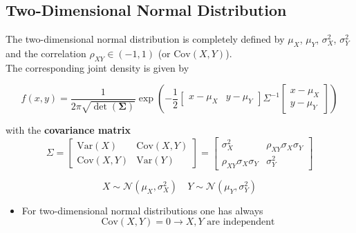 \subsection{Two-Dimensional Normal Distribution}
The two-dimensional normal distribution is completely defined by $\mu_X$, $\mu_Y$, $\sigma_X^2$, $\sigma_Y^2$ and the correlation $\rho_{XY}\in(-1,1)$ (or $\mathrm{Cov}(X,Y)$).\\
The corresponding joint density is given by
\begin{footnotesize}
    \noindent\begin{equation*}
        f(x,y) = \frac{1}{2\pi\sqrt{\det(\bm{\Sigma})}}\exp\left(-\frac{1}{2}\begin{bmatrix}x-\mu_X & y-\mu_Y\end{bmatrix}\Sigma^{-1}\begin{bmatrix}x-\mu_X \\ y-\mu_Y \end{bmatrix}\right)
    \end{equation*}
\end{footnotesize}
with the \textbf{covariance matrix}
\begin{equation*}
    \Sigma = \begin{bmatrix}
        \mathrm{Var}(X)   & \mathrm{Cov}(X,Y) \\
        \mathrm{Cov}(X,Y) & \mathrm{Var}(Y)
    \end{bmatrix}
    =
    \begin{bmatrix}
        \sigma_X^2                & \rho_{XY}\sigma_X\sigma_Y \\
        \rho_{XY}\sigma_X\sigma_Y & \sigma_Y^2
    \end{bmatrix}
\end{equation*}


\newpar{}
\begin{equation*}
    X \sim\mathcal{N}(\mu_X, \sigma_X^2) \quad Y \sim\mathcal{N}(\mu_Y, \sigma_Y^2)
\end{equation*}


\begin{itemize}
    \item For two-dimensional normal distributions one has always
          \begin{equation*}
              \mathrm{Cov}(X,Y)=0 \rightarrow X, Y \text{ are independent}
          \end{equation*}
\end{itemize}

